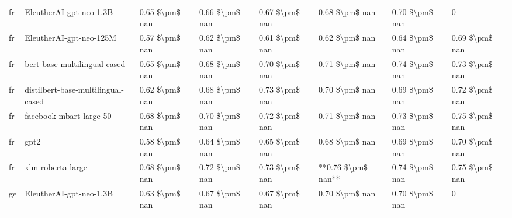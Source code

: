 \begin{tabular}{llllllll}
      fr &            EleutherAI-gpt-neo-1.3B & 0.65 \$\textbackslash pm\$ nan &            0.66 \$\textbackslash pm\$ nan &        0.67 \$\textbackslash pm\$ nan &         0.68 \$\textbackslash pm\$ nan &                          0.70 \$\textbackslash pm\$ nan &                  0 \\
      fr &            EleutherAI-gpt-neo-125M & 0.57 \$\textbackslash pm\$ nan &            0.62 \$\textbackslash pm\$ nan &        0.61 \$\textbackslash pm\$ nan &         0.62 \$\textbackslash pm\$ nan &                          0.64 \$\textbackslash pm\$ nan &     0.69 \$\textbackslash pm\$ nan \\
      fr &       bert-base-multilingual-cased & 0.65 \$\textbackslash pm\$ nan &            0.68 \$\textbackslash pm\$ nan &        0.70 \$\textbackslash pm\$ nan &         0.71 \$\textbackslash pm\$ nan &                          0.74 \$\textbackslash pm\$ nan &     0.73 \$\textbackslash pm\$ nan \\
      fr & distilbert-base-multilingual-cased & 0.62 \$\textbackslash pm\$ nan &            0.68 \$\textbackslash pm\$ nan &        0.73 \$\textbackslash pm\$ nan &         0.70 \$\textbackslash pm\$ nan &                          0.69 \$\textbackslash pm\$ nan &     0.72 \$\textbackslash pm\$ nan \\
      fr &            facebook-mbart-large-50 & 0.68 \$\textbackslash pm\$ nan &            0.70 \$\textbackslash pm\$ nan &        0.72 \$\textbackslash pm\$ nan &         0.71 \$\textbackslash pm\$ nan &                          0.73 \$\textbackslash pm\$ nan &     0.75 \$\textbackslash pm\$ nan \\
      fr &                               gpt2 & 0.58 \$\textbackslash pm\$ nan &            0.64 \$\textbackslash pm\$ nan &        0.65 \$\textbackslash pm\$ nan &         0.68 \$\textbackslash pm\$ nan &                          0.69 \$\textbackslash pm\$ nan &     0.70 \$\textbackslash pm\$ nan \\
      fr &                  xlm-roberta-large & 0.68 \$\textbackslash pm\$ nan &            0.72 \$\textbackslash pm\$ nan &        0.73 \$\textbackslash pm\$ nan &     **0.76 \$\textbackslash pm\$ nan** &                          0.74 \$\textbackslash pm\$ nan &     0.75 \$\textbackslash pm\$ nan \\
      ge &            EleutherAI-gpt-neo-1.3B & 0.63 \$\textbackslash pm\$ nan &            0.67 \$\textbackslash pm\$ nan &        0.67 \$\textbackslash pm\$ nan &         0.70 \$\textbackslash pm\$ nan &                          0.70 \$\textbackslash pm\$ nan &                  0 \\

\end{tabular}
